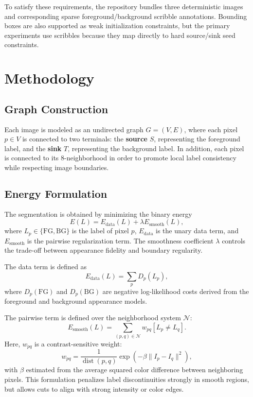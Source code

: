 \documentclass[conference]{IEEEtran}
\begin{document}
To satisfy these requirements, the repository bundles three deterministic images and corresponding sparse foreground/background scribble annotations. Bounding boxes are also supported as weak initialization constraints, but the primary experiments use scribbles because they map directly to hard source/sink seed constraints.

\section{Methodology}

\subsection{Graph Construction}
Each image is modeled as an undirected graph \(G = (V, E)\), where each pixel \(p \in V\) is connected to two terminals: the \textbf{source} \(S\), representing the foreground label, and the \textbf{sink} \(T\), representing the background label. In addition, each pixel is connected to its 8-neighborhood in order to promote local label consistency while respecting image boundaries.

\subsection{Energy Formulation}
The segmentation is obtained by minimizing the binary energy
\begin{equation}
E(L) = E_{\text{data}}(L) + \lambda E_{\text{smooth}}(L),
\end{equation}
where \(L_p \in \{\text{FG}, \text{BG}\}\) is the label of pixel \(p\), \(E_{\text{data}}\) is the unary data term, and \(E_{\text{smooth}}\) is the pairwise regularization term. The smoothness coefficient \(\lambda\) controls the trade-off between appearance fidelity and boundary regularity.

The data term is defined as
\begin{equation}
E_{\text{data}}(L) = \sum_p D_p(L_p),
\end{equation}
where \(D_p(\text{FG})\) and \(D_p(\text{BG})\) are negative log-likelihood costs derived from the foreground and background appearance models.

The pairwise term is defined over the neighborhood system \(\mathcal{N}\):
\begin{equation}
E_{\text{smooth}}(L) = \sum_{(p,q)\in\mathcal{N}} w_{pq}[L_p \neq L_q].
\end{equation}
Here, \(w_{pq}\) is a contrast-sensitive weight:
\begin{equation}
w_{pq} = \frac{1}{\operatorname{dist}(p,q)} \exp\left(-\beta \lVert I_p - I_q \rVert^2\right),
\end{equation}
with \(\beta\) estimated from the average squared color difference between neighboring pixels. This formulation penalizes label discontinuities strongly in smooth regions, but allows cuts to align with strong intensity or color edges.
\end{document}
